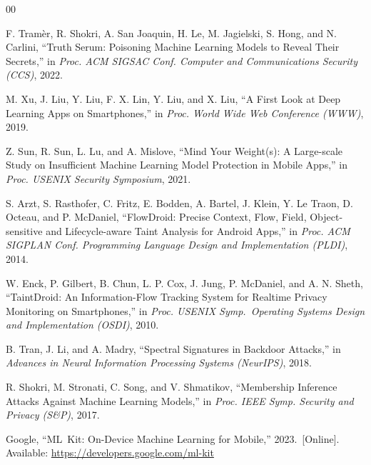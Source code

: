 \documentclass[conference]{IEEEtran}
\begin{document}
\begin{thebibliography}{00}

F. Tram\`{e}r, R. Shokri, A. San Joaquin, H. Le, M. Jagielski,
S. Hong, and N. Carlini, ``Truth Serum: Poisoning Machine Learning
Models to Reveal Their Secrets,'' in \emph{Proc. ACM SIGSAC Conf.
Computer and Communications Security (CCS)}, 2022.

M. Xu, J. Liu, Y. Liu, F. X. Lin, Y. Liu, and X. Liu,
``A First Look at Deep Learning Apps on Smartphones,'' in
\emph{Proc. World Wide Web Conference (WWW)}, 2019.

Z. Sun, R. Sun, L. Lu, and A. Mislove, ``Mind Your Weight(s):
A Large-scale Study on Insufficient Machine Learning Model Protection
in Mobile Apps,'' in \emph{Proc. USENIX Security Symposium}, 2021.

S. Arzt, S. Rasthofer, C. Fritz, E. Bodden, A. Bartel, J. Klein,
Y. Le Traon, D. Octeau, and P. McDaniel, ``FlowDroid: Precise
Context, Flow, Field, Object-sensitive and Lifecycle-aware Taint
Analysis for Android Apps,'' in \emph{Proc. ACM SIGPLAN Conf. Programming
Language Design and Implementation (PLDI)}, 2014.

W. Enck, P. Gilbert, B. Chun, L. P. Cox, J. Jung, P. McDaniel, and
A. N. Sheth, ``TaintDroid: An Information-Flow Tracking System for
Realtime Privacy Monitoring on Smartphones,'' in \emph{Proc. USENIX
Symp.\ Operating Systems Design and Implementation (OSDI)}, 2010.

B. Tran, J. Li, and A. Madry, ``Spectral Signatures in Backdoor
Attacks,'' in \emph{Advances in Neural Information Processing Systems
(NeurIPS)}, 2018.

R. Shokri, M. Stronati, C. Song, and V. Shmatikov, ``Membership
Inference Attacks Against Machine Learning Models,'' in \emph{Proc.
IEEE Symp. Security and Privacy (S\&P)}, 2017.

Google, ``ML~Kit: On-Device Machine Learning for Mobile,''
2023.\ [Online]. Available: \url{https://developers.google.com/ml-kit}

\end{thebibliography}
\end{document}
